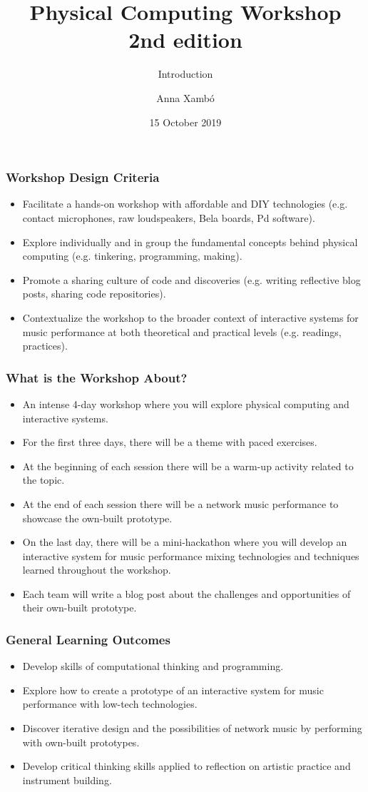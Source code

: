 \documentclass[screen, aspectratio=169]{beamer}
\title[PCW-d1]{Physical Computing Workshop\\2nd edition}
\subtitle{Introduction}
\author[A. Xamb{\'o}]{Anna Xamb{\'o}}
\institute[NTNU]{Department of Music, NTNU}
\date{15 October 2019}
\begin{document}
\begin{frame}
  \titlepage
\end{frame}



\begin{frame}
\frametitle{Workshop Design Criteria}
\begin{itemize}
\item Facilitate a hands-on workshop with affordable and DIY technologies (e.g. contact microphones, raw loudspeakers, Bela boards, Pd software).
\item Explore individually and in group the fundamental concepts behind physical computing (e.g. tinkering, programming, making).
\item Promote a sharing culture of code and discoveries (e.g. writing reflective blog posts, sharing code repositories).
\item Contextualize the workshop to the broader context of interactive systems for music performance at both theoretical and practical levels (e.g. readings, practices).
\end{itemize}
\end{frame}
%
\begin{frame}
\frametitle{What is the Workshop About?}
\begin{itemize}
\item An intense 4-day workshop where you will explore physical computing and interactive systems.
\item For the first three days, there will be a theme with paced exercises.
\item At the beginning of each session there will be a warm-up activity related to the topic.
\item At the end of each session there will be a network music performance to showcase the own-built prototype.
\item On the last day, there will be a mini-hackathon where you will develop an interactive system for music performance mixing technologies and techniques learned throughout the workshop.
\item Each team will write a blog post about the challenges and opportunities of their own-built prototype.
\end{itemize}
\end{frame}
%
\begin{frame}
\frametitle{General Learning Outcomes}
\begin{itemize}
\item Develop skills of computational thinking and programming.
\item Explore how to create a prototype of an interactive system for music performance with low-tech technologies.
\item Discover iterative design and the possibilities of network music by performing with own-built prototypes.
\item Develop critical thinking skills applied to reflection on artistic practice and instrument building.
\end{itemize}
\end{frame}
\end{document}
